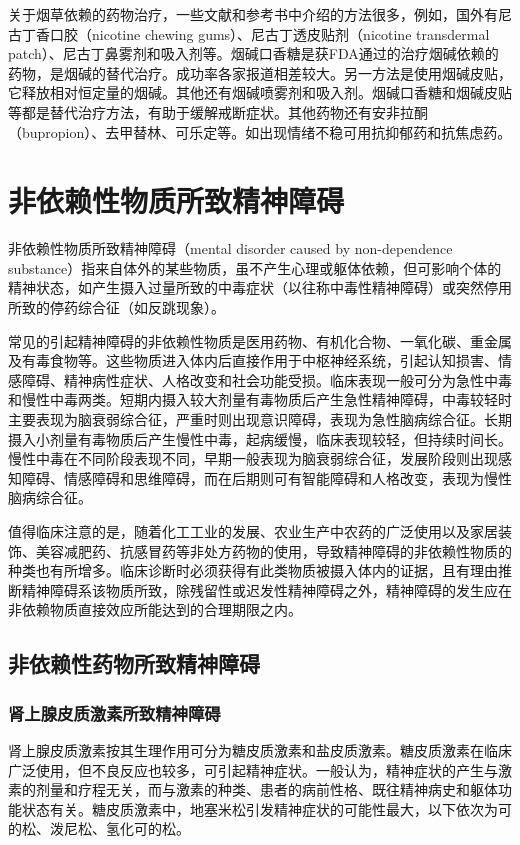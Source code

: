 关于烟草依赖的药物治疗，一些文献和参考书中介绍的方法很多，例如，国外有尼古丁香口胶（nicotine
chewing gums）、尼古丁透皮贴剂（nicotine transdermal
patch）、尼古丁鼻雾剂和吸入剂等。烟碱口香糖是获FDA通过的治疗烟碱依赖的药物，是烟碱的替代治疗。成功率各家报道相差较大。另一方法是使用烟碱皮贴，它释放相对恒定量的烟碱。其他还有烟碱喷雾剂和吸入剂。烟碱口香糖和烟碱皮贴等都是替代治疗方法，有助于缓解戒断症状。其他药物还有安非拉酮（bupropion）、去甲替林、可乐定等。如出现情绪不稳可用抗抑郁药和抗焦虑药。

\section{非依赖性物质所致精神障碍}

非依赖性物质所致精神障碍（mental disorder caused by non-dependence
substance）指来自体外的某些物质，虽不产生心理或躯体依赖，但可影响个体的精神状态，如产生摄入过量所致的中毒症状（以往称中毒性精神障碍）或突然停用所致的停药综合征（如反跳现象）。

常见的引起精神障碍的非依赖性物质是医用药物、有机化合物、一氧化碳、重金属及有毒食物等。这些物质进入体内后直接作用于中枢神经系统，引起认知损害、情感障碍、精神病性症状、人格改变和社会功能受损。临床表现一般可分为急性中毒和慢性中毒两类。短期内摄入较大剂量有毒物质后产生急性精神障碍，中毒较轻时主要表现为脑衰弱综合征，严重时则出现意识障碍，表现为急性脑病综合征。长期摄入小剂量有毒物质后产生慢性中毒，起病缓慢，临床表现较轻，但持续时间长。慢性中毒在不同阶段表现不同，早期一般表现为脑衰弱综合征，发展阶段则出现感知障碍、情感障碍和思维障碍，而在后期则可有智能障碍和人格改变，表现为慢性脑病综合征。

值得临床注意的是，随着化工工业的发展、农业生产中农药的广泛使用以及家居装饰、美容减肥药、抗感冒药等非处方药物的使用，导致精神障碍的非依赖性物质的种类也有所增多。临床诊断时必须获得有此类物质被摄入体内的证据，且有理由推断精神障碍系该物质所致，除残留性或迟发性精神障碍之外，精神障碍的发生应在非依赖物质直接效应所能达到的合理期限之内。

\subsection{非依赖性药物所致精神障碍}

\subsubsection{肾上腺皮质激素所致精神障碍}

肾上腺皮质激素按其生理作用可分为糖皮质激素和盐皮质激素。糖皮质激素在临床广泛使用，但不良反应也较多，可引起精神症状。一般认为，精神症状的产生与激素的剂量和疗程无关，而与激素的种类、患者的病前性格、既往精神病史和躯体功能状态有关。糖皮质激素中，地塞米松引发精神症状的可能性最大，以下依次为可的松、泼尼松、氢化可的松。

